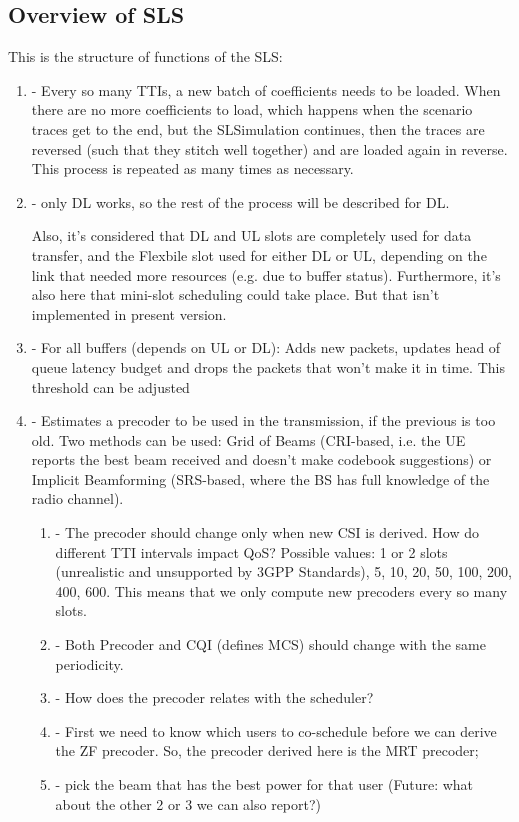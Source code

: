 \subsection{Overview of SLS}
This is the structure of functions of the SLS:
\begin{enumerate}
    \item {} - Every so many TTIs, a new batch of coefficients needs to be loaded. When there are no more coefficients to load, which happens when the scenario traces get to the end, but the SLSimulation continues, then the traces are reversed (such that they stitch well together) and are loaded again in reverse. This process is repeated as many times as necessary.
    \item {} - only DL works, so the rest of the process will be described for DL.
    
    Also, it's considered that DL and UL slots are completely used for data transfer, and the Flexbile slot used for either DL or UL, depending on the link that needed more resources (e.g. due to buffer status). Furthermore, it's also here that mini-slot scheduling could take place. But that isn't implemented in present version.
    \item {} - For all buffers (depends on UL or DL): Adds new packets, updates head of queue latency budget and drops the packets that won't make it in time. This threshold can be adjusted
    \item {} - Estimates a precoder to be used in the transmission, if the previous is too old. Two methods can be used:
    Grid of Beams (CRI-based, i.e. the UE reports the best beam received and doesn't make codebook suggestions) or Implicit Beamforming (SRS-based, where the BS has full knowledge of the radio channel).
        
        \begin{enumerate}
            \item {} - The precoder should change only when new CSI is derived. How do different TTI intervals impact QoS? Possible values: 1 or 2 slots (unrealistic and unsupported by 3GPP Standards), 5, 10, 20, 50, 100, 200, 400, 600. This means that we only compute new precoders every so many slots.
            \item {} - Both Precoder and CQI (defines MCS) should change with the same periodicity. 
            \item {} - How does the precoder relates with the scheduler? 
            \item {} - First we need to know which users to co-schedule before we can derive the ZF precoder. So, the precoder derived here is the MRT precoder;
            \item {} - pick the beam that has the best power for that user (Future: what about the other 2 or 3 we can also report?)
        \end{enumerate}


\end{enumerate}
